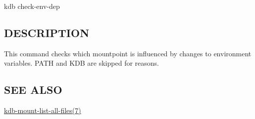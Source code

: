 {\ttfamily kdb check-\/env-\/dep}

\subsection*{D\+E\+S\+C\+R\+I\+P\+T\+I\+ON}

This command checks which mountpoint is influenced by changes to environment variables. {\ttfamily P\+A\+TH} and {\ttfamily K\+DB} are skipped for reasons.

\subsection*{S\+EE A\+L\+SO}


\begin{DoxyItemize}
\item \hyperlink{md_doc_help_kdb-mount-list-all-files_doc_help_kdb-mount-list-all-files_md}{kdb-\/mount-\/list-\/all-\/files(7)} 
\end{DoxyItemize}